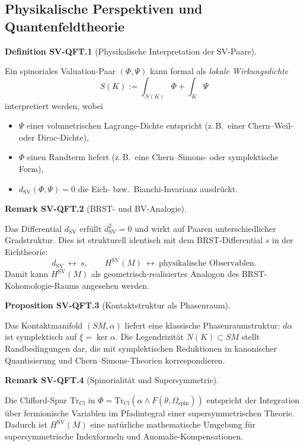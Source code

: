 \documentclass[10pt, letterpaper]{article}
\newcommand{\CustomHeading}[3]{%
  \par\medskip\noindent%
  \textbf{#1 #2} \textnormal{(#3)}.\enskip%
}
\newenvironment{DEF}[2]{\begin{unitbox}\CustomHeading{Definition}{#1}{#2}}{\end{unitbox}}
\newenvironment{PROP}[2]{\begin{unitbox}\CustomHeading{Proposition}{#1}{#2}}{\end{unitbox}}
\newenvironment{REM}[2]{\begin{unitbox}\CustomHeading{Remark}{#1}{#2}}{\end{unitbox}}
\begin{document}
\subsection{Physikalische Perspektiven und Quantenfeldtheorie}\label{subsec:SV-QFT}

\begin{DEF}{SV-QFT.1}{Physikalische Interpretation der SV-Paare}
Ein spinoriales Valuation-Paar $(\Phi,\Psi)$ kann formal als \emph{lokale Wirkungsdichte}
\[
S(K):=\int_{N(K)}\Phi+\int_K\Psi
\]
interpretiert werden, wobei
\begin{itemize}
\item $\Psi$ einer volumetrischen Lagrange-Dichte entspricht (z.\,B.\ einer Chern--Weil- oder Dirac-Dichte),
\item $\Phi$ einen Randterm liefert (z.\,B.\ eine Chern--Simons- oder symplektische Form),
\item $d_{\operatorname{SV}}(\Phi,\Psi)=0$ die Eich- bzw.\ Bianchi-Invarianz ausdrückt.
\end{itemize}
\end{DEF}

\begin{REM}{SV-QFT.2}{BRST- und BV-Analogie}
Das Differential $d_{\operatorname{SV}}$ erfüllt $d_{\operatorname{SV}}^2=0$ und wirkt auf Paaren unterschiedlicher Gradstruktur.
Dies ist strukturell identisch mit dem BRST-Differential $s$ in der Eichtheorie:
\[
d_{\operatorname{SV}}\ \leftrightarrow\ s,\qquad H^{\operatorname{SV}}(M)\ \leftrightarrow\ \text{physikalische Observablen}.
\]
Damit kann $H^{\operatorname{SV}}(M)$ als geometrisch-realisiertes Analogon des BRST-Kohomologie-Raums angesehen werden.
\end{REM}

\begin{PROP}{SV-QFT.3}{Kontaktstruktur als Phasenraum}
Das Kontaktmanifold $(SM,\alpha)$ liefert eine klassische Phasenraumstruktur:
$d\alpha$ ist symplektisch auf $\xi=\ker\alpha$.
Die Legendrizität $N(K)\subset SM$ stellt Randbedingungen dar, die mit symplektischen Reduktionen
in kanonischer Quantisierung und Chern--Simons-Theorien korrespondieren.
\end{PROP}

\begin{REM}{SV-QFT.4}{Spinorialität und Supersymmetrie}
Die Clifford-Spur $\mathrm{Tr}_{\mathrm{Cl}}$ in $\Phi=\mathrm{Tr}_{\mathrm{Cl}}(\alpha\wedge F(\theta,\Omega_{\mathrm{spin}}))$
entspricht der Integration über fermionische Variablen im Pfadintegral einer supersymmetrischen Theorie.
Dadurch ist $H^{\operatorname{SV}}(M)$ eine natürliche mathematische Umgebung für supersymmetrische Indexformeln
und Anomalie-Kompensationen.
\end{REM}
\end{document}
